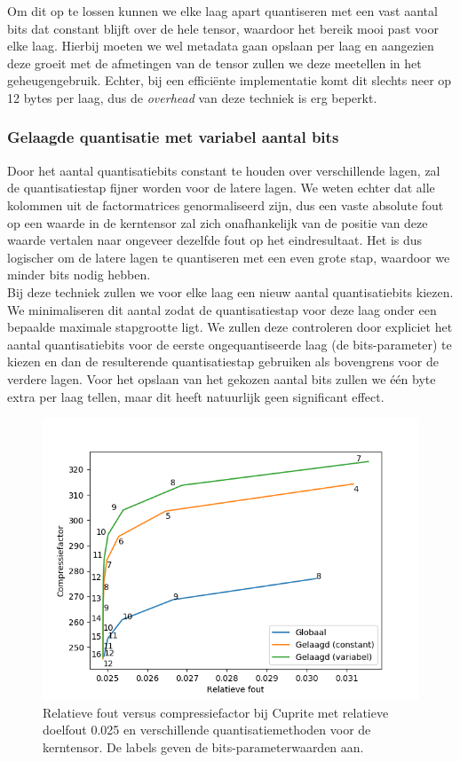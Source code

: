 Om dit op te lossen kunnen we elke laag apart quantiseren met een vast aantal bits dat constant blijft over de hele tensor, waardoor het bereik mooi past voor elke laag. Hierbij moeten we wel metadata gaan opslaan per laag en aangezien deze groeit met de afmetingen van de tensor zullen we deze meetellen in het geheugengebruik. Echter, bij een effici\"ente implementatie komt dit slechts neer op 12 bytes per laag, dus de \textit{overhead} van deze techniek is erg beperkt.

\subsubsection{Gelaagde quantisatie met variabel aantal bits}

Door het aantal quantisatiebits constant te houden over verschillende lagen, zal de quantisatiestap fijner worden voor de latere lagen. We weten echter dat alle kolommen uit de factormatrices genormaliseerd zijn, dus een vaste absolute fout op een waarde in de kerntensor zal zich onafhankelijk van de positie van deze waarde vertalen naar ongeveer dezelfde fout op het eindresultaat. Het is dus logischer om de latere lagen te quantiseren met een even grote stap, waardoor we minder bits nodig hebben.\\

Bij deze techniek zullen we voor elke laag een nieuw aantal quantisatiebits kiezen. We minimaliseren dit aantal zodat de quantisatiestap voor deze laag onder een bepaalde maximale stapgrootte ligt. We zullen deze controleren door expliciet het aantal quantisatiebits voor de eerste ongequantiseerde laag (de bits-parameter) te kiezen en dan de resulterende quantisatiestap gebruiken als bovengrens voor de verdere lagen. Voor het opslaan van het gekozen aantal bits zullen we \'e\'en byte extra per laag tellen, maar dit heeft natuurlijk geen significant effect.

\begin{figure}[H]
  \centering
  \includegraphics[scale=0.7]{images/core_tensor_quantization_comparison.png}
  \caption{Relatieve fout versus compressiefactor bij Cuprite met relatieve doelfout 0.025 en verschillende quantisatiemethoden voor de kerntensor. De labels geven de bits-parameterwaarden aan.}
\label{fig:core-tensor-quantization-comparison}
\end{figure}

